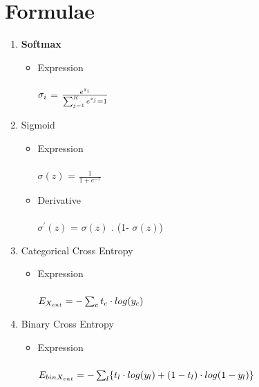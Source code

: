 \documentclass[11pt]{article}
\begin{document}
\section{Formulae}
\begin{enumerate}
    \item \bf{Softmax}
    \begin{itemize}
        \item Expression\\\\
        \(\sigma\sb{i}\) = $\frac{e^{z\sb{i}}}{\sum_{j=1}^{K} e^{z\sb{j}} = 1}$
    \end{itemize}
    
    \item Sigmoid
    \begin{itemize}
        \item Expression\\\\
        \(\sigma(z)\) = $\frac{1}{1+e^{-z}}$\\
        
        \item Derivative\\\\
        \(\sigma^{'}(z)\) = \(\sigma(z)\) . (1-  \(\sigma(z)\))%
    \end{itemize}
    
    \item Categorical Cross Entropy
    \begin{itemize}
        \item Expression\\\\
        $E\sb{X\sb{ent}} = -\sum_{c}^{} t\sb{c}\cdot log(y\sb{c})$
        
    \end{itemize}
    
    \item Binary Cross Entropy
    \begin{itemize}
        \item Expression\\\\
        $E\sb{bin X\sb{ent}} = -\sum_{l}^{} \{t\sb{l} \cdot log(y\sb{l}) + (1-t\sb{l}) \cdot log(1-y\sb{l})\}$
    \end{itemize}
    

\end{enumerate}
\end{document}
